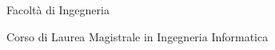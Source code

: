 \begin{titlepage}
\pagestyle{empty}

\begingroup
\vspace*{-7\topskip}


\begin{figure}[!h]
\begin{center}
\end{center}
\end{figure}

\begin{center}
        \LARGE{\rm\expandafter{Facolt\`a di Ingegneria}}\par
        \large\expandafter{Corso di Laurea Magistrale in Ingegneria Informatica}\par
\end{center}


\end{titlepage}
